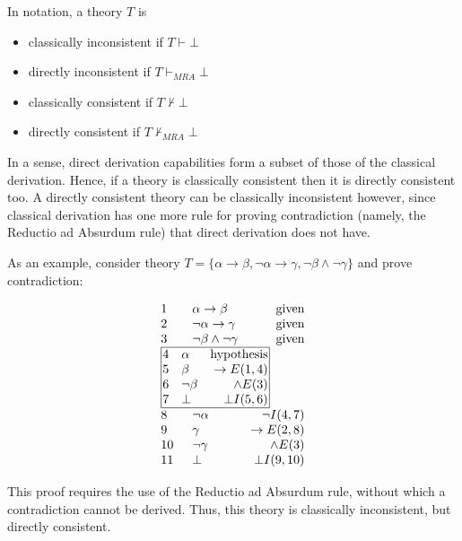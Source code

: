 \documentclass[11pt,twoside,a4paper]{report}
\begin{document}
In notation, a theory $T$ is
\begin{itemize}
\item
classically inconsistent if $T\vdash\bot$
\item
directly inconsistent if $T\vdash_{MRA}\bot$
\item
classically consistent if $T\nvdash\bot$
\item
directly consistent if $T\nvdash_{MRA}\bot$
\end{itemize}

In a sense, direct derivation capabilities form a subset of those of the classical derivation. Hence, if a theory is classically consistent then it is directly consistent too. A directly consistent theory can be classically inconsistent however, since classical derivation has one more rule for proving contradiction (namely, the Reductio ad Absurdum rule) that direct derivation does not have.

As an example, consider theory $T = \{\alpha\rightarrow\beta, \neg\alpha\rightarrow\gamma, \neg\beta\wedge\neg\gamma\}$ and prove contradiction:

\[\vbox{\offinterlineskip\halign{
&\tabskip=1.5em#\strut&$#$\hfil\tabskip=1em&\hfil$#$\tabskip=0em\cr
%
1&\alpha\rightarrow\beta&\mbox{given}\cr
2&\neg\alpha\rightarrow\gamma&\mbox{given}\cr
3&\neg\beta\wedge\neg\gamma&\mbox{given}\cr
%
\multispan3\vbox{\halign{
\vrule#&&\hskip.1em\tabskip=1em#\strut&$#$\hfil\tabskip=1em&\hfil$#$\hskip0.1em\tabskip=0em&\vrule#\cr
\noalign{\hrule}
%
&4&\alpha&\mbox{hypothesis}&\cr
&5&\beta&\rightarrow E(1,4)&\cr
&6&\neg\beta&\wedge E(3)&\cr
&7&\bot&\bot I(5,6)&\cr
%
\noalign{\hrule}}}\,\cr
%
8&\neg\alpha&\neg I(4,7)\cr
9&\gamma&\rightarrow E(2,8)\cr
10&\neg\gamma&\wedge E(3)\cr
11&\bot&\bot I(9,10)\cr
}}\]

This proof requires the use of the Reductio ad Absurdum rule, without which a contradiction cannot be derived. Thus, this theory is classically inconsistent, but directly consistent.
\end{document}
